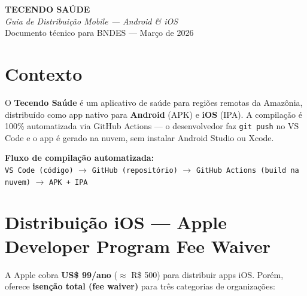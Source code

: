 \documentclass[12pt, a4paper]{article}
\begin{document}

\begin{tcolorbox}[
  colback=verdeE, colframe=verdeE,
  arc=8pt, boxrule=0pt,
  left=15pt, right=15pt, top=20pt, bottom=20pt
]
\begin{center}
  {\color{white}\fontsize{24}{28}\selectfont\textbf{TECENDO SA\'UDE}}\\[8pt]
  {\color{dourado}\large\textit{Guia de Distribui\c{c}\~ao Mobile --- Android \& iOS}}\\[8pt]
  {\color{white!70}\small Documento t\'ecnico para BNDES --- Mar\c{c}o de 2026}
\end{center}
\end{tcolorbox}

\vspace{0.8cm}


\section{Contexto}

O \textbf{Tecendo Sa\'ude} \'e um aplicativo de sa\'ude para regi\~oes remotas da Amaz\^onia, distribu\'ido como app nativo para \textbf{Android} (APK) e \textbf{iOS} (IPA). A compila\c{c}\~ao \'e 100\% automatizada via GitHub Actions --- o desenvolvedor faz \texttt{git push} no VS Code e o app \'e gerado na nuvem, sem instalar Android Studio ou Xcode.

\begin{caixainfo}
  \textbf{Fluxo de compila\c{c}\~ao automatizada:}\\[6pt]
  \texttt{VS Code (c\'odigo)} $\longrightarrow$ \texttt{GitHub (reposit\'orio)} $\longrightarrow$ \texttt{GitHub Actions (build na nuvem)} $\longrightarrow$ \texttt{APK + IPA}
\end{caixainfo}


\section{Distribui\c{c}\~ao iOS --- Apple Developer Program Fee Waiver}

A Apple cobra \textbf{US\$ 99/ano} ($\approx$ R\$ 500) para distribuir apps iOS. Por\'em, oferece \textbf{isen\c{c}\~ao total (fee waiver)} para tr\^es categorias de organiza\c{c}\~oes:
\end{document}
